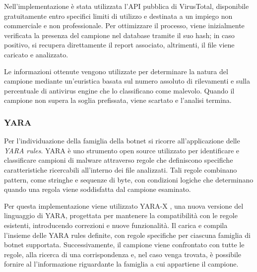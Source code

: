 Nell'implementazione è stata utilizzata l'API pubblica di VirusTotal, disponibile gratuitamente entro specifici limiti di utilizzo e destinata a un impiego non commerciale e non professionale. Per ottimizzare il processo, viene inizialmente verificata la presenza del campione nel database tramite il suo hash; in caso positivo, si recupera direttamente il report associato, altrimenti, il file viene caricato e analizzato.


Le informazioni ottenute vengono utilizzate per determinare la natura del campione mediante un'euristica basata sul numero assoluto di rilevamenti e sulla percentuale di antivirus engine che lo classificano come malevolo. Quando il campione non supera la soglia prefissata, viene scartato e l'analisi termina.

\subsubsection{YARA}

Per l'individuazione della famiglia della botnet si ricorre all'applicazione delle \emph{YARA rules}. YARA \cite{sikorski2012malware, yarax2026yara} è uno strumento open source utilizzato per identificare e classificare campioni di malware attraverso regole che definiscono specifiche caratteristiche ricercabili all'interno dei file analizzati. Tali regole combinano pattern, come stringhe e sequenze di byte, con condizioni logiche che determinano quando una regola viene soddisfatta dal campione esaminato. %


Per questa implementazione viene utilizzato YARA-X \cite{yarax2026yara}, una nuova versione del linguaggio di YARA, progettata per mantenere la compatibilità con le regole esistenti, introducendo correzioni e nuove funzionalità. Il \classifier{} carica e compila l'insieme delle YARA rules definite, con regole specifiche per ciascuna famiglia di botnet supportata. Successivamente, il campione viene confrontato con tutte le regole, alla ricerca di una corrispondenza e, nel caso venga trovata, è possibile fornire al \sreagent{} l'informazione riguardante la famiglia a cui appartiene il campione.



